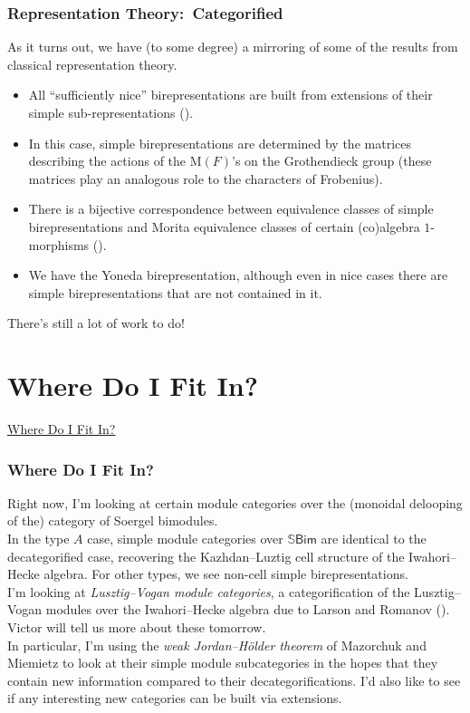 \documentclass{beamer}
\newcommand{\textcat}[1]{\mathrm{\textsf{#1}}}
\newcommand*{\emphasis}[1]{\textcolor{structure}{\em #1}}
\begin{document}
\begin{frame}
\frametitle{Representation Theory:\ Categorified}
As it turns out, we have (to some degree) a mirroring of some of the results from classical representation theory.\\[2ex]
\begin{itemize}
\item All ``sufficiently nice'' birepresentations are built from extensions of their simple sub-representations (\textcolor{structure}{\cite{MM16}}).
\item In this case, simple birepresentations are determined by the matrices describing the actions of the $\mathrm{M}(F)$'s on the Grothendieck group (these matrices play an analogous role to the characters of Frobenius).
\item There is a bijective correspondence between equivalence classes of simple birepresentations and Morita equivalence classes of certain (co)algebra $1$-morphisms (\textcolor{structure}{\cite{MMMT19}}).
\item We have the Yoneda birepresentation, although even in nice cases there are simple birepresentations that are not contained in it.\\[2ex]
\end{itemize}
There's still a lot of work to do!
\end{frame}


\section{Where Do I Fit In?}

\begin{frame}
\centerline{\huge\textcolor{structure}{\underline{Where Do I Fit In?}}}
\end{frame}

\begin{frame}
\frametitle{Where Do I Fit In?}
Right now, I'm looking at certain module categories over the (monoidal delooping of the) category of Soergel bimodules.\\[2ex]
In the type $A$ case, simple module categories over $\mathbb{S}\textcat{Bim}$ are identical to the decategorified case, recovering the Kazhdan--Luztig cell structure of the Iwahori--Hecke algebra. For other types, we see non-cell simple birepresentations.\\[2ex]
I'm looking at \emphasis{Lusztig--Vogan module categories}, a categorification of the Lusztig--Vogan modules over the Iwahori--Hecke algebra due to Larson and Romanov (\cite{LR22}). Victor will tell us more about these tomorrow.\\[2ex]
In particular, I'm using the \emphasis{weak Jordan--H\"{o}lder theorem} of Mazorchuk and Miemietz  to look at their simple module subcategories in the hopes that they contain new information compared to their decategorifications. I'd also like to see if any interesting new categories can be built via extensions.
\end{frame}
\end{document}
